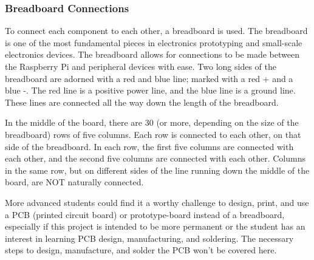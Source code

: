 \documentclass[titlepage]{article}
\begin{document}
\subsubsection*{Breadboard Connections}
To connect each component to each other, a breadboard is used. The breadboard is one of the most fundamental pieces in electronics prototyping and small-scale electronics devices. The breadboard allows for connections to be made between the Raspberry Pi and peripheral devices with ease. Two long sides of the breadboard are adorned with a red and blue line; marked with a red + and a blue -. The red line is a positive power line, and the blue line is a ground line. These lines are connected all the way down the length of the breadboard. \par
In the middle of the board, there are 30 (or more, depending on the size of the breadboard) rows of five columns. Each row is connected to each other, on that side of the breadboard. In each row, the first five columns are connected with each other, and the second five columns are connected with each other. Columns in the same row, but on different sides of the line running down the middle of the board, are NOT naturally connected. \par
More advanced students could find it a worthy challenge to design, print, and use a PCB (printed circuit board) or prototype-board instead of a breadboard, especially if this project is intended to be more permanent or the student has an interest in learning PCB design, manufacturing, and soldering. The necessary steps to design, manufacture, and solder the PCB won't be covered here. \par
\end{document}
